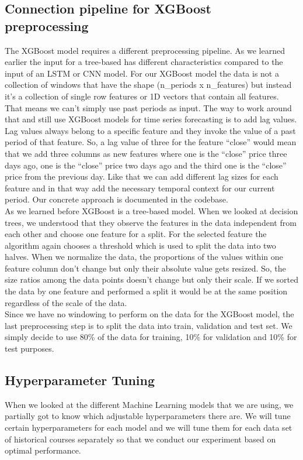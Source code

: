 \documentclass[a4paper,12pt]{report}
\begin{document}
			\subsection{Connection pipeline for XGBoost preprocessing}


The XGBoost model requires a different preprocessing pipeline. As we learned earlier the input for a tree-based has different characteristics compared to the input of an LSTM or CNN model. For our XGBoost model the data is not a collection of windows that have the shape (n\_periods x n\_features) but instead it’s a collection of single row features or 1D vectors that contain all features. That means we can’t simply use past periods as input. The way to work around that and still use XGBoost models for time series forecasting is to add lag values. Lag values always belong to a specific feature and they invoke the value of a past period of that feature. So, a lag value of three for the feature “close” would mean that we add three columns as new features where one is the “close” price three days ago, one is the “close” price two days ago and the third one is the “close” price from the previous day. Like that we can add different lag sizes for each feature and in that way add the necessary temporal context for our current period. Our concrete approach is documented in the codebase.\\
As we learned before XGBoost is a tree-based model. When we looked at decision trees, we understood that they observe the features in the data independent from each other and choose one feature for a split. For the selected feature the algorithm again chooses a threshold which is used to split the data into two halves. When we normalize the data, the proportions of the values within one feature column don’t change but only their absolute value gets resized. So, the size ratios among the data points doesn’t change but only their scale. If we sorted the data by one feature and performed a split it would be at the same position regardless of the scale of the data. \\
Since we have no windowing to perform on the data for the XGBoost model, the last preprocessing step is to split the data into train, validation and test set. We simply decide to use 80\% of the data for training, 10\% for validation and 10\% for test purposes.

			\subsection{Hyperparameter Tuning}
When we looked at the different Machine Learning models that we are using, we partially got to know which adjustable hyperparameters there are. We will tune certain hyperparameters for each model and we will tune them for each data set of historical courses separately so that we conduct our experiment based on optimal performance. \\
\end{document}
